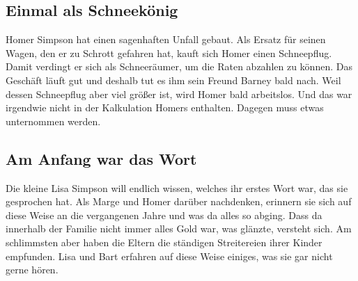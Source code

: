 \subsection{Einmal als Schneekönig}\label{9F07}
Homer Simpson hat einen sagenhaften Unfall gebaut. Als Ersatz für seinen Wagen, den er zu Schrott gefahren hat, kauft sich Homer einen Schneepflug. Damit verdingt er sich als Schnee\-räum\-er, um die Raten abzahlen zu können. Das Geschäft läuft gut und deshalb tut es ihm sein Freund Barney bald nach. Weil dessen Schneepflug aber viel größer ist, wird Homer bald arbeitslos. Und das war irgendwie nicht in der Kalkulation Homers enthalten. Dagegen muss etwas unternommen werden.


	
\subsection{Am Anfang war das Wort}\label{9F08}
Die kleine Lisa Simpson will endlich wissen, welches ihr erstes Wort war, das sie gesprochen hat. Als Marge und Homer darüber nachdenken, erinnern sie sich auf diese Weise an die vergangenen Jahre und was da alles so abging. Dass da innerhalb der Familie nicht immer alles Gold war, was glänzte, versteht sich. Am schlimmsten aber haben die Eltern die ständigen Streitereien ihrer Kinder empfunden. Lisa und Bart erfahren auf diese Weise einiges, was sie gar nicht gerne hören.

